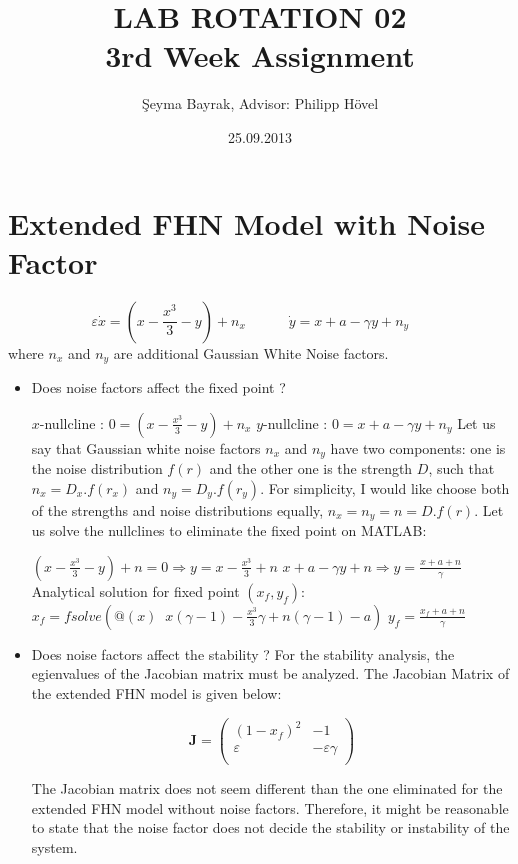 \documentclass{article}
\begin{document}
\title{LAB ROTATION 02 \\ 3rd Week Assignment }
\date{25.09.2013}
\author{\c{S}eyma Bayrak, Advisor: Philipp H\"{o}vel}
\maketitle

\section{Extended FHN Model with Noise Factor}
\begin{equation}
 \varepsilon\dot{x} = (x- \frac{x^3}{3}-y)+n_x \;\;\;\;\;\;\;\;\;\;\; \dot{y}=x+a -\gamma y +n_y  \;\;\;\;\;   
\end{equation}
where $n_x$ and $n_y$ are additional Gaussian White Noise factors. 

\begin{itemize}
 \item Does noise factors affect the fixed point ? 
 
$x$-nullcline : $0=(x- \frac{x^3}{3}-y)+n_x$ \newline
$y$-nullcline : $0=x+a -\gamma y +n_y$ \newline
Let us say that Gaussian white noise factors $n_x$ and $n_y$ have two components: one is the noise distribution $f(r)$ and the other one is the strength $D$, such that $n_x=D_x.f(r_x)$ and $n_y=D_y.f(r_y)$. For simplicity, I would like choose both of the strengths and noise distributions equally, $n_x=n_y=n=D.f(r)$. Let us solve the nullclines to eliminate the fixed point on MATLAB: 

$(x- \frac{x^3}{3}-y)+n=0 \Longrightarrow y=x-\frac{x^3}{3}+n$ \newline
$x+a -\gamma y +n \Longrightarrow y=\frac{x+a+n}{\gamma} $ \newline
Analytical solution for fixed point $(x_f,y_f)$: \newline
$x_f = fsolve(@(x)\;\; x(\gamma -1) -\frac{x^3}{3}\gamma+n(\gamma-1)-a)$\newline
$y_f = \frac{x_f+a+n}{\gamma}$

\item Does noise factors affect the stability ?
For the stability analysis, the egienvalues of the Jacobian matrix must be analyzed. The Jacobian Matrix of the extended FHN model is given below: 

\[
\textbf{J}=
\left( {\begin{array}{cc }
(1-x_f)^2  &  -1  \\
\varepsilon &  -\varepsilon\gamma  \\

\end{array} } \right)
\]

The Jacobian matrix does not seem different than the one eliminated for the extended FHN model without noise factors. Therefore, it might be reasonable to state that the noise factor does not decide the stability or instability of the system. 
\end{itemize}
\end{document}
